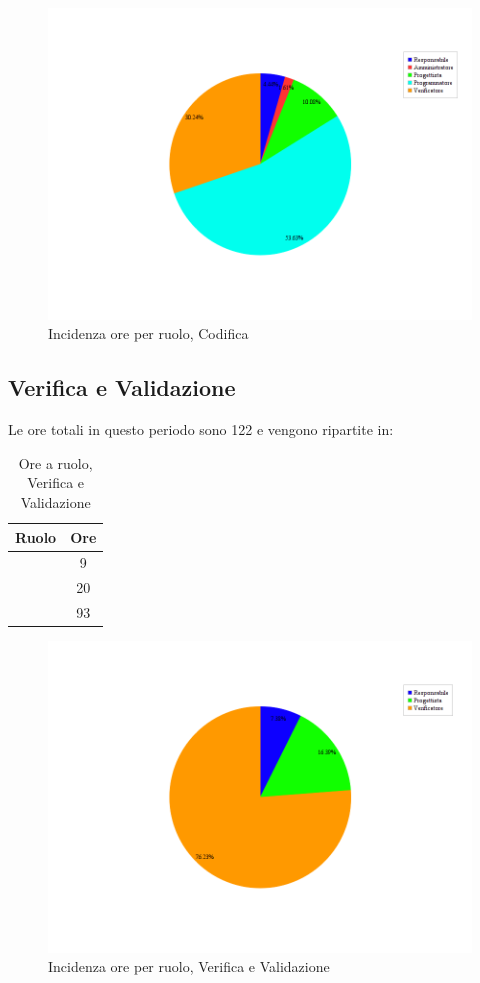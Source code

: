 \begin{figure}[H]
	\centering
	\includegraphics[scale=0.3]{immagini/Grafi/OreRuoloCod}
	\caption{Incidenza ore per ruolo, Codifica}
\end{figure}

\subsection{Verifica e Validazione}
Le ore totali in questo periodo sono 122 e vengono ripartite in:
\begin{table}[H]
	\begin{center}
		\begin{tabular}{|c|c|}
			\hline
			\textbf{Ruolo}	& \textbf{Ore} \\
			\hline
			\Res	&	9	\\
			\hline
			\Prog		&	20	\\
			\hline
			\Ver	&	93	\\
			\hline
		\end{tabular}
	\end{center}
	\caption{Ore a ruolo, Verifica e Validazione}
\end{table}

\begin{figure}[H]
	\centering
	\includegraphics[scale=0.3]{immagini/Grafi/OreRuoloVerifica}
	\caption{Incidenza ore per ruolo, Verifica e Validazione}
\end{figure}

